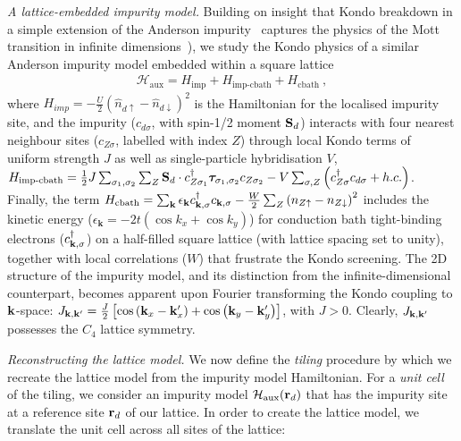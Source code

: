\documentclass[%
 reprint,
superscriptaddress,
groupedaddress,
 amsmath,amssymb,
 aps,
prl,superscriptaddress
]{revtex4-2}
\begin{document}
\par\noindent\textit{A lattice-embedded impurity model.}
Building on insight that Kondo breakdown in a simple extension of the Anderson impurity~\cite{Mukherjee_2023} captures the physics of the Mott transition in infinite dimensions~\cite{georges1996}), we study the Kondo physics of a similar Anderson impurity model embedded within a square lattice 
\begin{equation}\begin{aligned}\label{impurityModel}
	\mathcal{H}_\text{aux} = H_\text{imp} + H_\text{imp-cbath} + H_\text{cbath}~, 
\end{aligned}\end{equation}
where $H_{imp} = - \frac{U}{2}\left(\hat n_{d \uparrow} - \hat n_{d \downarrow} \right) ^2$ is the Hamiltonian for the localised impurity site, and the impurity ($c_{d\sigma}$, with spin-1/2 moment ${\bf S}_d$) 
interacts with four nearest neighbour sites ($c_{Z\sigma}$, labelled with index $Z$) 
through local Kondo terms of uniform strength $J$ as well as single-particle hybridisation $V$, \(H_\text{imp-cbath} =\frac{1}{2} J\sum_{\sigma_1,\sigma_2}\sum_{Z} {\bf S}_d\cdot c^\dagger_{Z\sigma_1}{\boldsymbol \tau}_{\sigma_1,\sigma_2} c_{Z\sigma_2} - V \sum_{\sigma, Z} \left(c^\dagger_{Z\sigma} c_{d\sigma} + h.c.\right)\). Finally, the term
$H_\text{cbath} = \sum_{{\bf k}}\epsilon_{\textbf{k}}
c^\dagger_{{\bf k},\sigma}c_{{\bf k},\sigma} -\frac{W}{2}\sum_{Z} \left(n_{Z\uparrow} - n_{Z\downarrow}\right)^2$ includes the kinetic energy ($\epsilon_{\textbf{k}}=-2t\left(\cos k_x + \cos k_y\right)$) for conduction bath tight-binding electrons ($c^\dagger_{{\bf k},\sigma}$) 
on a half-filled square lattice (with lattice spacing set to unity), together with local correlations ($W$) that frustrate the Kondo screening. The 2D structure of the impurity model, and its distinction from the infinite-dimensional counterpart, becomes apparent upon Fourier transforming the Kondo coupling to ${\bf k}$-space: 
$J_{{\bf k}, {\bf k}^\prime} = \frac{J}{2}\left[\cos\left({\bf k}_x - {\bf k}^\prime_x\right) + \cos\left({\bf k}_y - {\bf k}^\prime_y\right)\right]$, with $J>0$. Clearly, $J_{{\bf k}, {\bf k}^\prime}$ 
possesses the $C_{4}$ lattice symmetry. 
\par\noindent\textit{Reconstructing the lattice model.}
We now define the {\it tiling} procedure by which we recreate the lattice model from the impurity model Hamiltonian. For a {\it unit cell} of the tiling,  
we consider an impurity model \(\mathcal{H}_\text{aux}({\bf r}_d)\) that has the impurity site at a reference site \({\bf r}_d\) of our lattice. In order to create the lattice model, we translate the unit cell across all sites of the lattice:
\end{document}
